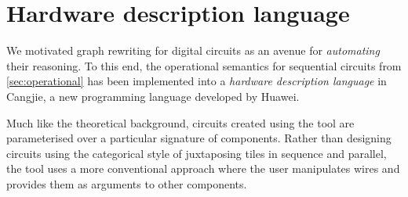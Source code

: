 \section{Hardware description language}

We motivated graph rewriting for digital circuits as an avenue for
\emph{automating} their reasoning.
To this end, the operational semantics for sequential circuits from
\cref{sec:operational} has been implemented into a
\emph{hardware description language} in Cangjie, a new programming
language developed by Huawei.

Much like the theoretical background, circuits created using the tool are
parameterised over a particular signature of components.
Rather than designing circuits using the categorical style of juxtaposing
tiles in sequence and parallel, the tool uses a more conventional approach
where the user manipulates wires and provides them as arguments to other
components.

